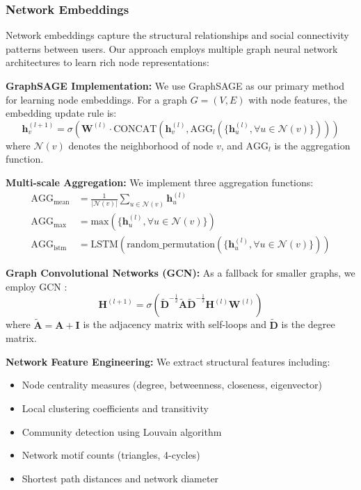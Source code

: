 \documentclass[conference]{IEEEtran}
\begin{document}
\subsubsection{Network Embeddings}

Network embeddings capture the structural relationships and social connectivity patterns between users. Our approach employs multiple graph neural network architectures to learn rich node representations:

\textbf{GraphSAGE Implementation:} We use GraphSAGE \cite{hamilton2017inductive} as our primary method for learning node embeddings. For a graph $G = (V, E)$ with node features, the embedding update rule is:
\begin{equation}
\mathbf{h}_v^{(l+1)} = \sigma\left(\mathbf{W}^{(l)} \cdot \text{CONCAT}\left(\mathbf{h}_v^{(l)}, \text{AGG}_l\left(\{\mathbf{h}_u^{(l)}, \forall u \in \mathcal{N}(v)\}\right)\right)\right)
\end{equation}
where $\mathcal{N}(v)$ denotes the neighborhood of node $v$, and $\text{AGG}_l$ is the aggregation function.

\textbf{Multi-scale Aggregation:} We implement three aggregation functions:
\begin{align}
\text{AGG}_{\text{mean}} &= \frac{1}{|\mathcal{N}(v)|} \sum_{u \in \mathcal{N}(v)} \mathbf{h}_u^{(l)} \\
\text{AGG}_{\text{max}} &= \text{max}\left(\{\mathbf{h}_u^{(l)}, \forall u \in \mathcal{N}(v)\}\right) \\
\text{AGG}_{\text{lstm}} &= \text{LSTM}\left(\text{random\_permutation}(\{\mathbf{h}_u^{(l)}, \forall u \in \mathcal{N}(v)\})\right)
\end{align}

\textbf{Graph Convolutional Networks (GCN):} As a fallback for smaller graphs, we employ GCN \cite{kipf2016semi}:
\begin{equation}
\mathbf{H}^{(l+1)} = \sigma\left(\tilde{\mathbf{D}}^{-\frac{1}{2}}\tilde{\mathbf{A}}\tilde{\mathbf{D}}^{-\frac{1}{2}}\mathbf{H}^{(l)}\mathbf{W}^{(l)}\right)
\end{equation}
where $\tilde{\mathbf{A}} = \mathbf{A} + \mathbf{I}$ is the adjacency matrix with self-loops and $\tilde{\mathbf{D}}$ is the degree matrix.

\textbf{Network Feature Engineering:} We extract structural features including:
\begin{itemize}
\item Node centrality measures (degree, betweenness, closeness, eigenvector)
\item Local clustering coefficients and transitivity
\item Community detection using Louvain algorithm
\item Network motif counts (triangles, 4-cycles)
\item Shortest path distances and network diameter
\end{itemize}
\end{document}
